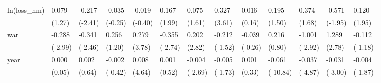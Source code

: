 \begin{tabular}{p{1.5cm} p{1.7cm} p{1.7cm} p{1.7cm} p{1.7cm} p{1.7cm} p{1.7cm} p{1.7cm} p{1.7cm} p{1.7cm} p{1.7cm} p{1.7cm} p{1.7cm}}
\hline
ln(loss\_nm)     &    0.079         &   -0.217\sym{*}  &   -0.035         &   -0.019         &    0.167         &    0.075         &    0.327\sym{***}&    0.016         &    0.195         &    0.374         &   -0.571         &    0.120         \\
                &   (1.27)         &  (-2.41)         &  (-0.25)         &  (-0.40)         &   (1.99)         &   (1.61)         &   (3.61)         &   (0.16)         &   (1.50)         &   (1.68)         &  (-1.95)         &   (1.95)         \\
war             &   -0.288\sym{**} &   -0.341\sym{*}  &    0.256         &    0.279\sym{***}&   -0.355\sym{**} &    0.202\sym{**} &   -0.212         &   -0.039         &    0.216         &   -1.001\sym{**} &    1.289\sym{**} &   -0.112         \\
                &  (-2.99)         &  (-2.46)         &   (1.20)         &   (3.78)         &  (-2.74)         &   (2.82)         &  (-1.52)         &  (-0.26)         &   (0.80)         &  (-2.92)         &   (2.78)         &  (-1.18)         \\
year            &    0.000         &    0.002         &   -0.002         &    0.008\sym{***}&    0.001         &   -0.004\sym{**} &   -0.005         &    0.001         &   -0.061\sym{***}&   -0.037\sym{***}&   -0.031\sym{**} &   -0.004         \\
                &   (0.05)         &   (0.64)         &  (-0.42)         &   (4.64)         &   (0.52)         &  (-2.69)         &  (-1.73)         &   (0.33)         & (-10.84)         &  (-4.87)         &  (-3.00)         &  (-1.87)         \\
\end{tabular}
